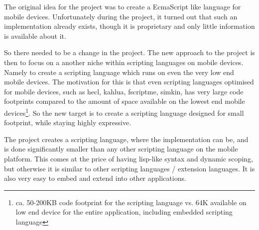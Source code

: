 The original idea for the project was to create a EcmaScript like language for mobile devices. 
Unfortunately during the project, it turned out that such an implementation already exists,
though it is proprietary and only little information is available about it\cite{mojax}.

So there needed to be a change in the project.
The new approach to the project is then to focus on a another niche within scripting languages on mobile devices. Namely to create a scripting language which runs on even the very low end mobile devices.
The motivation for this is that even scripting languages optimised for mobile devices, such as hecl\cite{hecl}, kahlua\cite{kahlua}, fscriptme\cite{fscriptme}, simkin\cite{simkin}, has very large code footprints compared to the amount of space available on the lowest end mobile devices\footnote{ca. 50-200KB code footprint for the scripting language vs. 64K available on low end device for the entire application, including embedded scripting language}.
So the new target is to create a scripting language designed for small footprint, while staying highly expressive.

The project creates a scripting language, where the implementation can be, and is done significantly smaller than any other scripting language on the mobile platform.
This comes at the price of having lisp-like syntax and dynamic scoping, but otherwise it is similar to other scripting languages / extension languages. It is also very easy to embed and extend into other applications.
